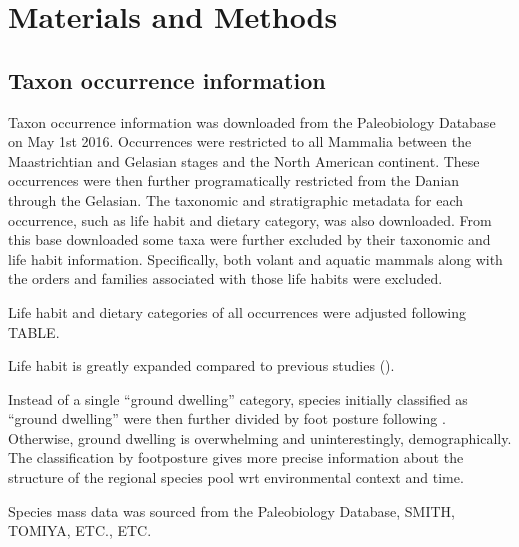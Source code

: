 \documentclass[12pt,letterpaper]{article}
\begin{document}
\section*{Materials and Methods}

\subsection*{Taxon occurrence information}


Taxon occurrence information was downloaded from the Paleobiology Database on May 1st 2016. Occurrences were restricted to all Mammalia between the Maastrichtian and Gelasian stages and  the North American continent. These occurrences were then further programatically restricted from the Danian through the Gelasian. The taxonomic and stratigraphic metadata for each occurrence, such as life habit and dietary category, was also downloaded. From this base downloaded some taxa were further excluded by their taxonomic and life habit information. Specifically, both volant and aquatic mammals along with the orders and families associated with those life habits were excluded. 


Life habit and dietary categories of all occurrences were adjusted following TABLE. 

Life habit is greatly expanded compared to previous studies (\citep{Smits2015}).

Instead of a single ``ground dwelling'' category, species initially classified as ``ground dwelling'' were then further divided by foot posture following \citet{Carrano1997}. Otherwise, ground dwelling is overwhelming and uninterestingly, demographically. The classification by footposture gives more precise information about the structure of the regional species pool wrt environmental context and time.

Species mass data was sourced from the Paleobiology Database, SMITH, TOMIYA, ETC., ETC.


\end{document}
